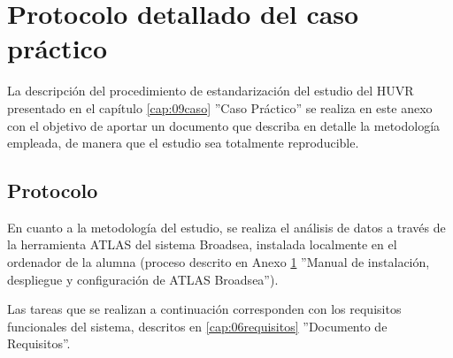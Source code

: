 \chapter{Protocolo detallado del caso práctico}\label{anexo:manual}

La descripción del procedimiento de estandarización del estudio del HUVR presentado en el capítulo \ref{cap:09caso} ''Caso Práctico'' se realiza en este anexo con el objetivo de aportar un documento que describa en detalle la metodología empleada, de manera que el estudio sea totalmente reproducible. 


\section{Protocolo}

En cuanto a la metodología del estudio, se realiza el análisis de datos a través de la herramienta ATLAS del sistema Broadsea, instalada localmente en el ordenador de la alumna (proceso descrito en Anexo \ref{anexo:manual} ''Manual de instalación, despliegue y configuración de ATLAS Broadsea''). 

Las tareas que se realizan a continuación corresponden con los requisitos funcionales del sistema, descritos en \ref{cap:06requisitos} ''Documento de Requisitos''.



